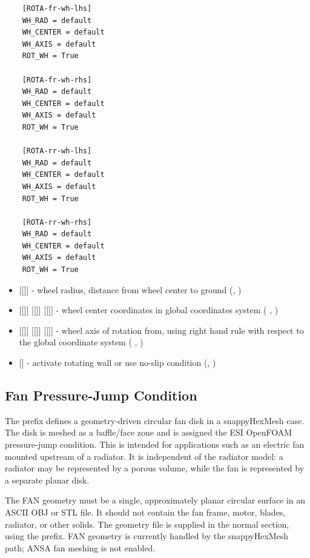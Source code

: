 \begin{lstlisting}
    [ROTA-fr-wh-lhs]
    WH_RAD = default
    WH_CENTER = default
    WH_AXIS = default
    ROT_WH = True

    [ROTA-fr-wh-rhs]
    WH_RAD = default
    WH_CENTER = default
    WH_AXIS = default
    ROT_WH = True

    [ROTA-rr-wh-lhs]
    WH_RAD = default
    WH_CENTER = default
    WH_AXIS = default
    ROT_WH = True

    [ROTA-rr-wh-rhs]
    WH_RAD = default
    WH_CENTER = default
    WH_AXIS = default
    ROT_WH = True

\end{lstlisting}
\begin{itemize}
    \item {} [[]] - wheel radius, distance from wheel center to ground (, )
    \item {} [[]] [[]] [[]] - wheel center coordinates in global coordinates system (  , )
    \item {} [[]] [[]] [[]] - wheel axis of rotation from, using right hand rule with respect to the global coordinate system (  , )
    \item {} [] - activate rotating wall or use no-slip condition (, )
\end{itemize}

\subsection{Fan Pressure-Jump Condition}
The prefix  defines a geometry-driven circular fan disk in a snappyHexMesh case. The disk is meshed as a baffle/face zone and is assigned the ESI OpenFOAM  pressure-jump condition. This is intended for applications such as an electric fan mounted upstream of a radiator. It is independent of the  radiator model: a radiator may be represented by a porous volume, while the fan is represented by a separate planar disk.

The FAN geometry must be a single, approximately planar circular surface in an ASCII OBJ or STL file. It should not contain the fan frame, motor, blades, radiator, or other solids. The geometry file is supplied in the normal \codeword{[GEOMETRY]} section, using the  prefix. FAN geometry is currently handled by the snappyHexMesh path; ANSA fan meshing is not enabled.

